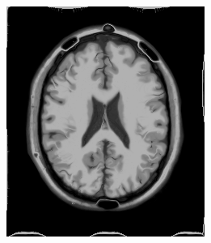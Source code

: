\begin{figure}[H]
\begin{subfigure}[t]{0.25\textwidth}
	  \label{fig:sindist-image-tps} 
	\end{subfigure} \\
	\begin{subfigure}[t]{0.25\textwidth}
	  \includegraphics[width=\textwidth]{figuras/resultSinDemon.png}
	  \label{fig:sin-image-demon}
	\end{subfigure}
	\begin{subfigure}[t]{0.25\textwidth}

\end{subfigure}
\end{figure}
